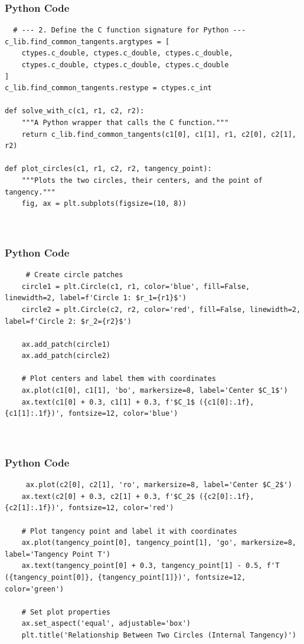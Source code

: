 \documentclass{beamer}
\begin{document}
    \begin{frame}[fragile]
        \frametitle{Python Code}
        \begin{lstlisting}
  # --- 2. Define the C function signature for Python ---
c_lib.find_common_tangents.argtypes = [
    ctypes.c_double, ctypes.c_double, ctypes.c_double,
    ctypes.c_double, ctypes.c_double, ctypes.c_double
]
c_lib.find_common_tangents.restype = ctypes.c_int

def solve_with_c(c1, r1, c2, r2):
    """A Python wrapper that calls the C function."""
    return c_lib.find_common_tangents(c1[0], c1[1], r1, c2[0], c2[1], r2)

def plot_circles(c1, r1, c2, r2, tangency_point):
    """Plots the two circles, their centers, and the point of tangency."""
    fig, ax = plt.subplots(figsize=(10, 8))

   
        \end{lstlisting}
    \end{frame}
    
    \begin{frame}[fragile]
        \frametitle{Python Code}
        \begin{lstlisting}
     # Create circle patches
    circle1 = plt.Circle(c1, r1, color='blue', fill=False, linewidth=2, label=f'Circle 1: $r_1={r1}$')
    circle2 = plt.Circle(c2, r2, color='red', fill=False, linewidth=2, label=f'Circle 2: $r_2={r2}$')

    ax.add_patch(circle1)
    ax.add_patch(circle2)

    # Plot centers and label them with coordinates
    ax.plot(c1[0], c1[1], 'bo', markersize=8, label='Center $C_1$')
    ax.text(c1[0] + 0.3, c1[1] + 0.3, f'$C_1$ ({c1[0]:.1f}, {c1[1]:.1f})', fontsize=12, color='blue')
    
   
        \end{lstlisting}
    \end{frame}
    
    \begin{frame}[fragile]
        \frametitle{Python Code}
        \begin{lstlisting}
     ax.plot(c2[0], c2[1], 'ro', markersize=8, label='Center $C_2$')
    ax.text(c2[0] + 0.3, c2[1] + 0.3, f'$C_2$ ({c2[0]:.1f}, {c2[1]:.1f})', fontsize=12, color='red')

    # Plot tangency point and label it with coordinates
    ax.plot(tangency_point[0], tangency_point[1], 'go', markersize=8, label='Tangency Point T')
    ax.text(tangency_point[0] + 0.3, tangency_point[1] - 0.5, f'T ({tangency_point[0]}, {tangency_point[1]})', fontsize=12, color='green')

    # Set plot properties
    ax.set_aspect('equal', adjustable='box')
    plt.title('Relationship Between Two Circles (Internal Tangency)')
    

        \end{lstlisting}
    \end{frame}
\end{document}
